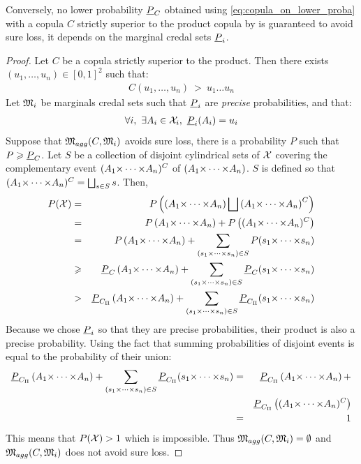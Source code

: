 Conversely, no lower probability ${\underline{P}}_C$ obtained using \eqref{eq:copula_on_lower_proba} with a copula $C$ strictly superior to the product copula by is guaranteed to avoid sure loss, it depends on the marginal credal sets ${\underline{P}}_i$.

\begin{proof}
    Let $C$ be a copula strictly superior to the product. Then there exists $(u_1,\dots,u_n)\in[0,1]^2$ such that:
    \begin{eqnarray*}
        C(u_1,\dots, u_n)~>~u_1\dots u_n
    \end{eqnarray*}
    Let ${\mathfrak{M}}_i$ be marginals credal sets such that ${\underline{P}}_i$ are \textit{precise} probabilities, and that:
    \begin{eqnarray*}
        \forall i,~\exists A_i\in{\mathcal{X}}_i,~{\underline{P}}_i(A_i)=u_i
    \end{eqnarray*}
    Suppose that ${\mathfrak{M}}_{agg}(C, {\mathfrak{M}}_i)$ avoids sure loss, \ie there is a probability $P$ such that $P\geqslant{\underline{P}}_C$. Let $S$ be a collection of disjoint cylindrical sets of ${\mathcal{X}}$ covering the complementary event $(A_1{\times\dots\times} A_n)^C$ of $(A_1{\times\dots\times} A_n)$. $S$ is defined so that $(A_1{\times\dots\times} A_n)^C=\bigsqcup_{s\in S}s$.
    Then,
    \begin{eqnarray*}
        P({\mathcal{X}}) &=& P\left(\left(A_1{\times\dots\times} A_n\right)\bigsqcup\left(A_1{\times\dots\times} A_n\right)^C\right)\\
        &=& P\left(A_1{\times\dots\times} A_n\right)+P\left((A_1{\times\dots\times} A_n)^C\right)\\
        &=& P\left(A_1{\times\dots\times} A_n\right)+\sum_{(s_1{\times\dots\times} s_n)\in S}P(s_1{\times\dots\times} s_n)\\
        &\geqslant& {\underline{P}}_C\left(A_1{\times\dots\times} A_n\right)+\sum_{(s_1{\times\dots\times} s_n)\in S}{\underline{P}}_C(s_1{\times\dots\times} s_n)\\
        &>& {\underline{P}}_{C_\Pi}\left(A_1{\times\dots\times} A_n\right)+\sum_{(s_1{\times\dots\times} s_n)\in S}{\underline{P}}_{C_\Pi}(s_1{\times\dots\times} s_n)
    \end{eqnarray*}
    Because we chose ${\underline{P}}_i$ so that they are precise probabilities, their product is also a precise probability. Using the fact that summing probabilities of disjoint events is equal to the probability of their union:
    \begin{eqnarray*}
        {\underline{P}}_{C_\Pi}\left(A_1{\times\dots\times} A_n\right)+\sum_{(s_1{\times\dots\times} s_n)\in S}{\underline{P}}_{C_\Pi}(s_1{\times\dots\times} s_n) &=& {\underline{P}}_{C_\Pi}\left(A_1{\times\dots\times} A_n\right)+\\
        &&{\underline{P}}_{C_\Pi}\left((A_1{\times\dots\times} A_n)^C\right)\\
        &=& 1
    \end{eqnarray*}
    This means that $P({\mathcal{X}})>1$ which is impossible. Thus ${\mathfrak{M}}_{agg}(C, {\mathfrak{M}}_i)=\emptyset$ and ${\mathfrak{M}}_{agg}(C, {\mathfrak{M}}_i)$ does not avoid sure loss.
\end{proof}


